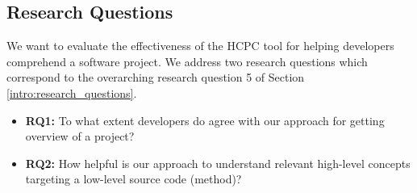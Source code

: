 \subsection{Research Questions}
\label{hla3:evaluation}
We want to evaluate the effectiveness of the HCPC tool for helping developers comprehend a software project. We address two research questions which correspond to the overarching research question 5 of Section \ref{intro:research_questions}.
\begin{itemize}
    \item \textbf{RQ1:} To what extent developers do agree with our approach for getting overview of a project?
    \item \textbf{RQ2:} How helpful is our approach to understand relevant high-level concepts targeting a low-level source code (method)?
\end{itemize}
